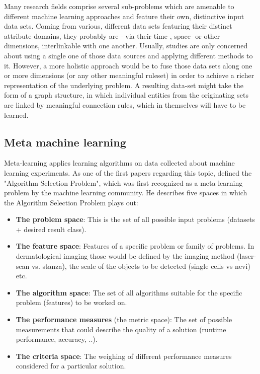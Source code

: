 Many research fields comprise several sub-problems which are amenable to different machine learning approaches and feature their own, distinctive input data sets. Coming from various, different data sets featuring their distinct attribute domains, they probably are - via their time-, space- or other dimensions, interlinkable with one another. Usually, studies are only concerned about using a single one of those data sources and applying different methods to it. However, a more holistic approach would be to fuse those data sets along one or more dimensions (or any other meaningful ruleset) in order to achieve a richer representation of the underlying problem. A resulting data-set might take the form of a graph structure, in which individual entities from the originating sets are linked by meaningful connection rules, which in themselves will have to be learned. 


\subsection{Meta machine learning}
\label{ssect:meta_ml}

Meta-learning applies learning algorithms on data collected about machine learning experiments. As one of the first papers regarding this topic, \citep{Rice1975} defined the "Algorithm Selection Problem", which was first recognized as a meta learning problem by the machine learning community. He describes five spaces in which the Algorithm Selection Problem plays out:

\begin{itemize}
	\item \textbf{The problem space}: This is the set of all possible input problems (datasets + desired result class).
	
	\item \textbf{The feature space}: Features of a specific problem or family of problems. In dermatological imaging those would be defined by the imaging method (laser-scan vs. stanza), the scale of the objects to be detected (single cells vs nevi) etc.
	
	\item \textbf{The algorithm space}: The set of all algorithms suitable for the specific problem (features) to be worked on.
	
	\item \textbf{The performance measures} (the metric space): The set of possible measurements that could describe the quality of a solution (runtime performance, accuracy, ..).
	
	\item \textbf{The criteria space}: The weighing of different performance measures considered for a particular solution.
\end{itemize}



